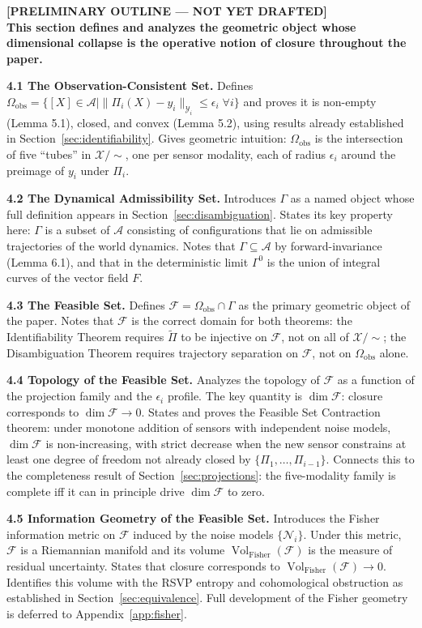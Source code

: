 \documentclass[12pt, oneside]{article}
\newcommand{\preliminary}[1]{%
  \colorbox{yellow!20}{\parbox{\dimexpr\linewidth-2\fboxsep}{%
    \textbf{\textcolor{red!70!black}{[PRELIMINARY OUTLINE --- NOT YET DRAFTED]}}\\[4pt]
    #1
  }}%
}
\DeclareMathOperator{\vol}{Vol}
\newcommand{\Xmod}{\mathcal{X}/{\sim}}
\newcommand{\Ftil}{\widetilde{\Pi}}
\begin{document}
\preliminary{
\textbf{This section defines and analyzes the geometric object whose dimensional collapse
is the operative notion of closure throughout the paper.}

\medskip
\textbf{4.1 The Observation-Consistent Set.}
Defines $\Omega_{\mathrm{obs}} = \{[X] \in \mathcal{A} \mid \|\Pi_i(X) - y_i\|_{\mathcal{Y}_i}
\le \epsilon_i\; \forall i\}$ and proves it is non-empty (Lemma 5.1), closed, and convex
(Lemma 5.2), using results already established in Section~\ref{sec:identifiability}.
Gives geometric intuition: $\Omega_{\mathrm{obs}}$ is the intersection of five ``tubes''
in $\Xmod$, one per sensor modality, each of radius $\epsilon_i$ around the preimage
of $y_i$ under $\Pi_i$.

\medskip
\textbf{4.2 The Dynamical Admissibility Set.}
Introduces $\Gamma$ as a named object whose full definition appears in
Section~\ref{sec:disambiguation}. States its key property here: $\Gamma$ is a subset of
$\mathcal{A}$ consisting of configurations that lie on admissible trajectories of the world
dynamics. Notes that $\Gamma \subseteq \mathcal{A}$ by forward-invariance (Lemma 6.1), and
that in the deterministic limit $\Gamma^0$ is the union of integral curves of the vector
field $F$.

\medskip
\textbf{4.3 The Feasible Set.}
Defines $\mathcal{F} = \Omega_{\mathrm{obs}} \cap \Gamma$ as the primary geometric object
of the paper. Notes that $\mathcal{F}$ is the correct domain for both theorems: the
Identifiability Theorem requires $\Ftil$ to be injective on $\mathcal{F}$, not on all of
$\Xmod$; the Disambiguation Theorem requires trajectory separation on $\mathcal{F}$, not
on $\Omega_{\mathrm{obs}}$ alone.

\medskip
\textbf{4.4 Topology of the Feasible Set.}
Analyzes the topology of $\mathcal{F}$ as a function of the projection family and the
$\epsilon_i$ profile. The key quantity is $\dim \mathcal{F}$: closure corresponds to
$\dim \mathcal{F} \to 0$. States and proves the Feasible Set Contraction theorem: under
monotone addition of sensors with independent noise models, $\dim \mathcal{F}$ is
non-increasing, with strict decrease when the new sensor constrains at least one degree of
freedom not already closed by $\{\Pi_1,\ldots,\Pi_{i-1}\}$. Connects this to the
completeness result of Section~\ref{sec:projections}: the five-modality family is complete
iff it can in principle drive $\dim \mathcal{F}$ to zero.

\medskip
\textbf{4.5 Information Geometry of the Feasible Set.}
Introduces the Fisher information metric on $\mathcal{F}$ induced by the noise models
$\{\mathcal{N}_i\}$. Under this metric, $\mathcal{F}$ is a Riemannian manifold and its
volume $\vol_{\mathrm{Fisher}}(\mathcal{F})$ is the measure of residual uncertainty.
States that closure corresponds to $\vol_{\mathrm{Fisher}}(\mathcal{F}) \to 0$. Identifies
this volume with the RSVP entropy and cohomological obstruction as established in
Section~\ref{sec:equivalence}. Full development of the Fisher geometry is deferred to
Appendix~\ref{app:fisher}.

}
\end{document}
